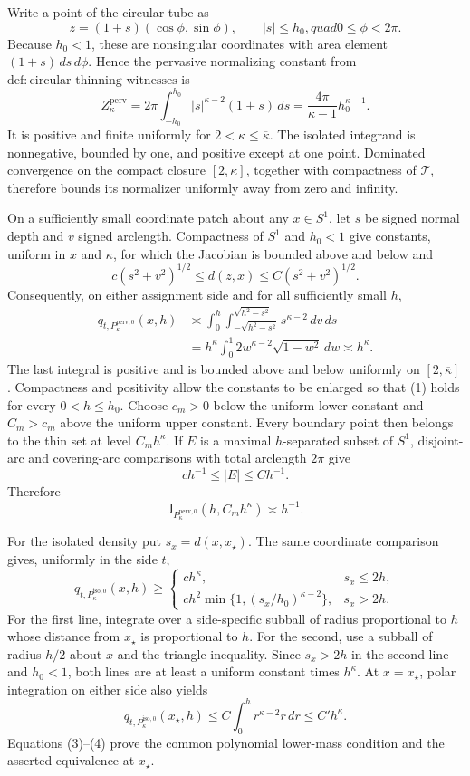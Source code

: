 Write a point of the circular tube as
\[
 z=(1+s)(\cos\phi,\sin\phi),\qquad |s|\le h_0,quad 0\le\phi<2\pi.
\]
Because \(h_0<1\), these are nonsingular coordinates with area element \((1+s)\,ds\,d\phi\). Hence the pervasive normalizing constant from \(\mathrm{def:circular\text{-}thinning\text{-}witnesses}\) is
\[
 Z_{\kappa}^{\mathrm{perv}}
 =2\pi\int_{-h_0}^{h_0}|s|^{\kappa-2}(1+s)\,ds
 =\frac{4\pi}{\kappa-1}h_0^{\kappa-1}.
\]
It is positive and finite uniformly for \(2<\kappa\le\overline\kappa\). The isolated integrand is nonnegative, bounded by one, and positive except at one point. Dominated convergence on the compact closure \([2,\overline\kappa]\), together with compactness of \(\mathcal T\), therefore bounds its normalizer uniformly away from zero and infinity.

On a sufficiently small coordinate patch about any \(x\in S^1\), let \(s\) be signed normal depth and \(v\) signed arclength. Compactness of \(S^1\) and \(h_0<1\) give constants, uniform in \(x\) and \(\kappa\), for which the Jacobian is bounded above and below and
\[
 c(s^2+v^2)^{1/2}\le d(z,x)\le C(s^2+v^2)^{1/2}.
\]
Consequently, on either assignment side and for all sufficiently small \(h\),
\[
 \begin{aligned}
 q_{t,P_{\kappa}^{\mathrm{perv},0}}(x,h)
 &\asymp \int_0^h\int_{-\sqrt{h^2-s^2}}^{\sqrt{h^2-s^2}}
 s^{\kappa-2}\,dv\,ds\\
 &=h^{\kappa}\int_0^1 2w^{\kappa-2}\sqrt{1-w^2}\,dw
 \asymp h^{\kappa}.
 \end{aligned} \tag{1}
\]
The last integral is positive and is bounded above and below uniformly on \([2,\overline\kappa]\). Compactness and positivity allow the constants to be enlarged so that (1) holds for every \(0<h\le h_0\). Choose \(c_m>0\) below the uniform lower constant and \(C_m>c_m\) above the uniform upper constant. Every boundary point then belongs to the thin set at level \(C_mh^{\kappa}\). If \(E\) is a maximal \(h\)-separated subset of \(S^1\), disjoint-arc and covering-arc comparisons with total arclength \(2\pi\) give
\[
 c h^{-1}\le |E|\le C h^{-1}.
\]
Therefore
\[
 \mathsf J_{P_{\kappa}^{\mathrm{perv},0}}(h,C_mh^{\kappa})\asymp h^{-1}. \tag{2}
\]

For the isolated density put \(s_x=d(x,x_{\star})\). The same coordinate comparison gives, uniformly in the side \(t\),
\[
 q_{t,P_{\kappa}^{\mathrm{iso},0}}(x,h)\ge
 \begin{cases}
 c h^{\kappa},&s_x\le2h,\\
 c h^2\min\{1,(s_x/h_0)^{\kappa-2}\},&s_x>2h.
 \end{cases} \tag{3}
\]
For the first line, integrate over a side-specific subball of radius proportional to \(h\) whose distance from \(x_{\star}\) is proportional to \(h\). For the second, use a subball of radius \(h/2\) about \(x\) and the triangle inequality. Since \(s_x>2h\) in the second line and \(h_0<1\), both lines are at least a uniform constant times \(h^{\kappa}\). At \(x=x_{\star}\), polar integration on either side also yields
\[
 q_{t,P_{\kappa}^{\mathrm{iso},0}}(x_{\star},h)
 \le C\int_0^h r^{\kappa-2}r\,dr
 \le C'h^{\kappa}. \tag{4}
\]
Equations (3)--(4) prove the common polynomial lower-mass condition and the asserted equivalence at \(x_{\star}\).

